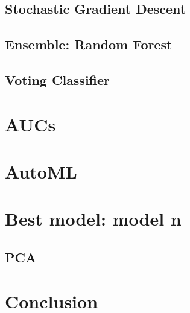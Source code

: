 \documentclass[titlepage, 11pt]{article}
\begin{document}
\subsection{Stochastic Gradient Descent}


\subsection{Ensemble: Random Forest}


\subsection{Voting Classifier}


\section{AUCs}


\section{AutoML}


\section{Best model: model n}
\subsection{PCA}

\section{Conclusion}

\end{document}
